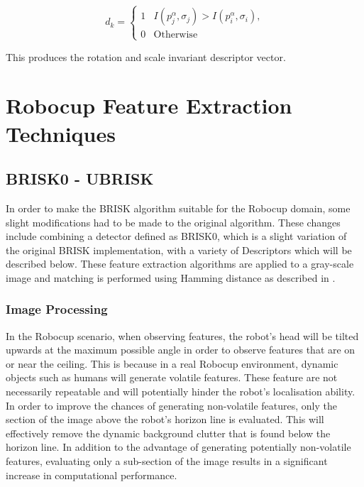 \documentclass{article}
\begin{document}
\begin{equation}
d_k = \left\{ \begin{array}{rl}
1 &\mbox{$I(p_j^{\alpha}, \sigma_j) > I(p_i^{\alpha}, \sigma_i)$,} \\
0 &\mbox{Otherwise}
\end{array} \right.
\label{eqn:brightness}
\end{equation}

This produces the rotation and scale invariant descriptor vector.\\ 

\section{Robocup Feature Extraction Techniques}
\label{sec:realtimeFeatureExtraction}

\subsection{BRISK0 - UBRISK}
\label{sec:brisk0}
In order to make the BRISK algorithm suitable for the Robocup domain, some slight modifications had to be made to the original algorithm. These changes include combining a detector defined as BRISK0, which is a slight variation of the original BRISK implementation, with a variety of Descriptors which will be described below. These feature extraction algorithms are applied to a gray-scale image and matching is performed using Hamming distance as described in .\\

\subsubsection{Image Processing}
\label{sec:imageProcessingBrisk}
In the Robocup scenario, when observing features, the robot's head will be tilted upwards at the maximum possible angle in order to observe features that are on or near the ceiling. This is because in a real Robocup environment, dynamic objects such as humans will generate volatile features. These feature are not necessarily repeatable and will potentially hinder the robot's localisation ability.\\

In order to improve the chances of generating non-volatile features, only the section of the image above the robot's horizon line is evaluated. This will effectively remove the dynamic background clutter that is found below the horizon line. In addition to the advantage of generating potentially non-volatile features, evaluating only a sub-section of the image results in a significant increase in computational performance. \\ 
\end{document}
